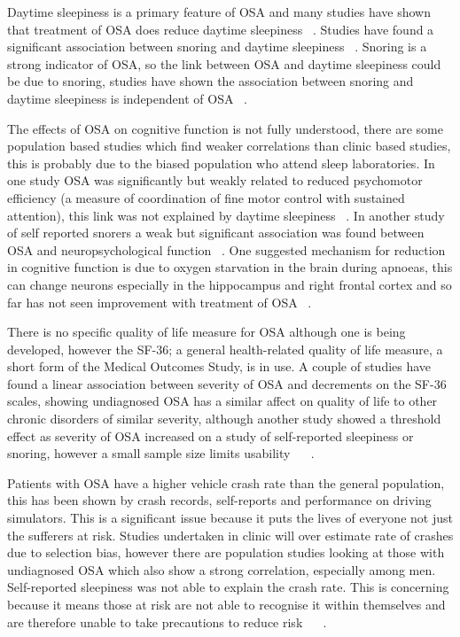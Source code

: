 Daytime sleepiness is a primary feature of OSA and many studies have shown that treatment of OSA does reduce daytime sleepiness ~\cite{ballester1999evidence}. Studies have found a significant association between snoring and daytime sleepiness ~\cite{engleman1999randomized}. Snoring is a strong indicator of OSA, so the link between OSA and daytime sleepiness could be due to snoring, studies have shown the association between snoring and daytime sleepiness is independent of OSA ~\cite{stradling1991self}.

The effects of OSA on cognitive function is not fully understood, there are some population based studies which find weaker correlations than clinic based studies, this is probably due to the biased population who attend sleep laboratories. In one study OSA was significantly but weakly related to reduced psychomotor efficiency (a measure of coordination of fine motor control with sustained attention), this link was not explained by daytime sleepiness ~\cite{kim1997sleep}. In another study of self reported snorers a weak but significant association was found between OSA and neuropsychological function ~\cite{adams2001relation}. One suggested mechanism for reduction in cognitive function is due to oxygen starvation in the brain during apnoeas, this can change neurons especially in the hippocampus and right frontal cortex and so far has not seen improvement with treatment of OSA ~\cite{gale2004effects}.

There is no specific quality of life measure for OSA although one is being developed, however the SF-36; a general health-related quality of life measure, a short form of the Medical Outcomes Study, is in use. A couple of studies have found a linear association between severity of OSA and decrements on the SF-36 scales, showing undiagnosed OSA has a similar affect on quality of life to other chronic disorders of similar severity, although another study showed a threshold effect as severity of OSA increased on a study of self-reported sleepiness or snoring, however a small sample size limits usability ~\cite{finn1998sleep} ~\cite{baldwin2001association}.

Patients with OSA have a higher vehicle crash rate than the general population, this has been shown by crash records, self-reports and performance on driving simulators. This is a significant issue because it puts the lives of everyone not just the sufferers at risk. Studies undertaken in clinic will over estimate rate of crashes due to selection bias, however there are population studies looking at those with undiagnosed OSA which also show a strong correlation, especially among men. Self-reported sleepiness was not able to explain the crash rate. This is concerning because it means those at risk are not able to recognise it within themselves and are therefore unable to take precautions to reduce risk ~\cite{findley1988automobile} ~\cite{findley1989driving}.

